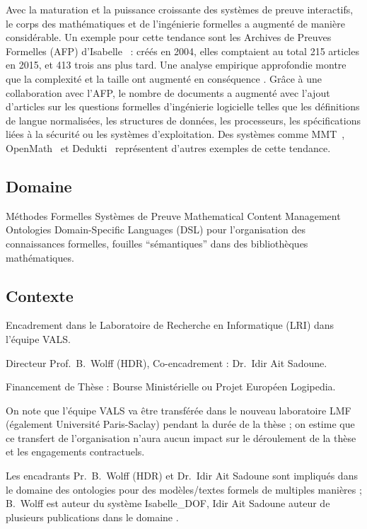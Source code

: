 \documentclass[a4paper,10pt]{article}
\begin{document}
Avec la maturation et la puissance croissante
des systèmes de preuve interactifs,
le corps des mathématiques et de l'ingénierie formelles a augmenté
de manière considérable.
Un exemple pour cette tendance sont
les Archives de Preuves Formelles (AFP) d'Isabelle~\cite{afp} :
créés en 2004, elles comptaient au total 215 articles en 2015,
et 413 trois ans plus tard.
Une analyse empirique approfondie montre que
la complexité et la taille ont augmenté en conséquence
\cite{DBLP:conf/mkm/BlanchetteHMN15}.
Grâce à une collaboration avec l'AFP,
le nombre de documents a augmenté avec l'ajout d'articles
sur les questions formelles d'ingénierie logicielle
telles que les définitions de langue normalisées,
les structures de données, les processeurs,
les spécifications liées à la sécurité  ou les systèmes d'exploitation.
Des systèmes comme MMT~\cite{mmt}, OpenMath~\cite{openmath}
et Dedukti~\cite{dedukti} représentent
d'autres exemples de cette tendance.

\subsection*{Domaine}

Méthodes Formelles \textemdash{}
Systèmes de Preuve \textemdash{}
Mathematical Content Management \textemdash{}
Ontologies \textemdash{}
Domain-Specific Languages (DSL)
pour l'organisation des connaissances formelles,
fouilles \enquote{sémantiques} dans des bibliothèques mathématiques.

\subsection*{Contexte}

Encadrement dans le Laboratoire de Recherche en Informatique (LRI)
dans l'équipe VALS\@.

Directeur Prof.\ B.\ Wolff (HDR), Co-encadrement : Dr.\ Idir Ait Sadoune.

Financement de Thèse : Bourse Ministérielle ou Projet Européen Logipedia.

On note que l'équipe VALS va être transférée
dans le nouveau laboratoire LMF (également Université Paris-Saclay)
pendant la durée de la thèse ;
on estime que ce transfert de l'organisation n'aura aucun impact
sur le déroulement de la thèse et les engagements contractuels.

Les encadrants Pr.\ B.\ Wolff (HDR) et Dr.\ Idir Ait Sadoune sont impliqués
dans le domaine des ontologies pour des modèles/textes formels
de multiples manières ;
B.\ Wolff est auteur du système Isabelle\_DOF,
Idir Ait Sadoune auteur de plusieurs publications dans le domaine
\cite{DBLP:conf/medi/Ait-SadouneM19}.
\end{document}
